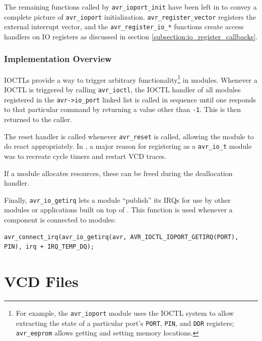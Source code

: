 The remaining functions called by \lstinline|avr_ioport_init|
have been left in to convey a complete picture of \verb|avr_ioport|
initialization. \lstinline|avr_register_vector| registers the external interrupt vector,
and the \lstinline|avr_register_io_*| functions create access handlers on \ac{IO}
registers as discussed in section \ref{subsection:io_register_callbacks}.

\subsubsection{Implementation Overview}

\acp{IOCTL} provide a way to trigger arbitrary functionality\footnote{
%
For example, the \lstinline|avr_ioport|
module uses the \ac{IOCTL} system to allow extracting the state of a particular port's
\lstinline|PORT|, \lstinline|PIN|, and \lstinline|DDR| registers; \lstinline|avr_eeprom|
allows getting and setting memory locations.
%
} in modules. Whenever
a \ac{IOCTL} is triggered by calling \lstinline|avr_ioctl|, the \ac{IOCTL} handler
of all modules registered in the \lstinline|avr->io_port| linked list is called
in sequence until one responds to that particular command by returning a value
other than \lstinline|-1|. This is then returned to the caller.

The reset handler is called whenever \lstinline|avr_reset| is called, allowing
the module to do react appropriately. In \qsimavr, a major reason for registering
as a \lstinline|avr_io_t| module was to recreate cycle timers and restart \ac{VCD}
traces.

If a module allocates resources, these can be freed during the deallocation handler.

Finally, \lstinline|avr_io_getirq| lets a module ``publish'' its \acp{IRQ} for
use by other modules or applications built on top of \simavr. This function is
used whenever a \qsimavr component is connected to \simavr modules:

\begin{lstlisting}
avr_connect_irq(avr_io_getirq(avr, AVR_IOCTL_IOPORT_GETIRQ(PORT), PIN), irq + IRQ_TEMP_DQ);
\end{lstlisting}


\section{\acf{VCD} Files} \label{section:vcd_files}

